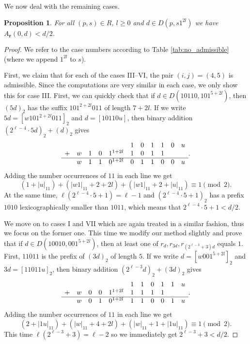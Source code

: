 \documentclass[a4paper,11pt]{amsart}
\newtheorem{prop}[thm]{Proposition}
\theoremstyle{definition}
\begin{document}
We now deal with the remaining cases.
\begin{prop}
    For all $(p,s) \in R$, $l \geq 0$ and $d \in D(p,s1^{2l})$ we have $A_{\mathbf{r}}(0,d) < d/2$.
\end{prop}
\begin{proof}
    We refer to the case numbers according to Table \ref{tab:no_admissible} (where we append $1^{2l}$ to $s$).
    
    First, we claim that for each of the cases III--VI, the pair $(i,j)=(4,5)$ is admissible. Since the computations are very similar in each case, we only show this for case III. First, we can quickly check that if $d \in D(10110,101^{5+2l})$, then $(5d)_2$ has the suffix $101^{2+2l}011$ of length $7+2l$. If we write $5d =[w101^{2+2l}011]_2$ and $d=[10110u]$, then binary addition $(2^{\ell-4} \cdot 5 d)_2 + (d)_2$ gives
    $$ \begin{array}{lllllllllll}
       &   &   &   &   & 1 & 0 & 1 & 1 & 0 & u \\
+      & w & 1 & 0 & 1^{1+2l} & 1 & 0  & 1 & 1 & & \\
\hline & w & 1 & 1 & 0^{1+2l} & 0 & 1 & 1 & 0 & 0 & u
\end{array}.$$
Adding the number occurrences of $11$ in each line we get
$$ (1+|u|_{11}) + (|w1|_{11} + 2+2l) + (|w1|_{11} + 2+|u|_{11}) \equiv 1 \pmod{2}. $$
At the same time, $\ell(2^{\ell-4} \cdot 5 +1) = \ell -1$ and $(2^{\ell-4} \cdot 5 +1)_2$ has a prefix $1010$ lexicographically smaller than $1011$, which means that $2^{\ell-4} \cdot 5 +1 < d/2$.

We move on to cases I and VII which are again treated in a similar fashion, thus we focus on the former one. This time we modify our method slightly and prove that if $d \in D(10010,001^{5+2l})$, then at least one of $r_{d}, r_{3d}, r_{(2^{\ell-3}+3)d}$ equals $1$. First, $11011$ is the prefix of $(3d)_2$ of length $5$. If we write $d =[w001^{5+2l}]_2$ and $3d=[11011u]_2$, then binary addition $(2^{\ell-3}d)_2 + (3d)_2$ gives
$$ \begin{array}{lllllllllll}
       &   &   &   &   & 1 & 1 & 0 & 1 & 1 & u \\
+      & w & 0 & 0 & 1^{1+2l} & 1 & 1  & 1 & 1 &  & \\
\hline & w & 0 & 1 & 0^{1+2l} & 1 & 1 & 0 & 0 & 1 & u
\end{array}.$$
Adding the number occurrences of $11$ in each line we get
$$ (2+ |1u|_{11}) +  (|w|_{11} + 4+2l) + (|w|_{11}+1+|1u|_{11}) \equiv 1 \pmod{2}. $$
This time $\ell(2^{\ell-3} + 3) = \ell - 2$ so we immediately get $2^{\ell-3} + 3 < d/2$.


\end{proof}
\end{document}
